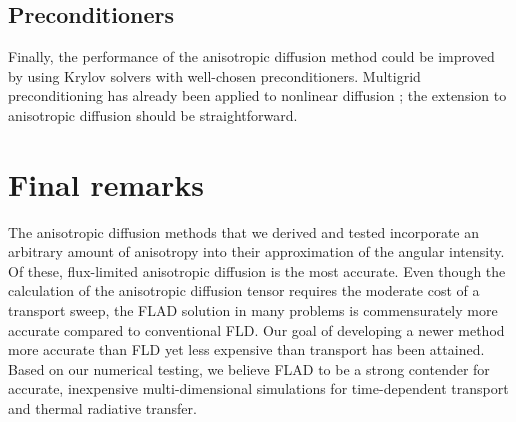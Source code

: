 \subsection{Preconditioners}

Finally, the performance of the anisotropic diffusion method could be improved
by using Krylov solvers with well-chosen preconditioners. Multigrid
preconditioning has already been applied to nonlinear diffusion \cite{Rid1999};
the extension to anisotropic diffusion should be straightforward.

\section{Final remarks}

The anisotropic diffusion methods that we derived and tested incorporate an
arbitrary amount of anisotropy into their approximation of the angular
intensity. Of these, flux-limited anisotropic diffusion is the most accurate.
Even though the calculation of the anisotropic diffusion tensor
requires the moderate cost of a transport sweep, the FLAD solution in many
problems is commensurately more accurate compared to conventional FLD. Our
goal of developing a newer method more accurate than FLD yet less expensive
than transport has been attained. Based on
our numerical testing, we believe FLAD to be a strong contender for
accurate, inexpensive multi-dimensional simulations for time-dependent
transport and thermal radiative transfer.


